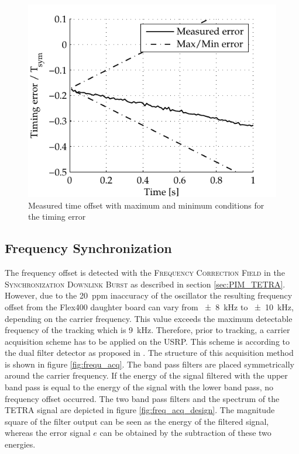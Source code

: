 \begin{figure}[htb]
	\centering
		\includegraphics{../kapitel04/figures/usrp_time_offset.pdf}
	\caption{Measured time offset with maximum and minimum conditions for the timing error}
	\label{fig:usrp_time_offset}
\end{figure}

\subsection{Frequency Synchronization}
The frequency offset is detected with the \textsc{Frequency Correction Field} in the \textsc{Synchronization Downlink Burst} as described in section \ref{sec:PIM_TETRA}. However, due to the \SI{20}{ppm} inaccuracy of the oscillator the resulting frequency offset from the Flex400 daughter board can vary from \SI{\pm 8}{kHz} to \SI{\pm 10}{kHz}, depending on the carrier frequency. This value exceeds the maximum detectable frequency of the tracking which is \SI{9}{kHz}. Therefore, prior to tracking, a carrier acquisition scheme has to be applied on the \ac{USRP}. This scheme is according to the dual filter detector as proposed in \cite{alberty}. The structure of this acquisition method is shown in figure \ref{fig:frequ_acq}. The band pass filters are placed symmetrically around the carrier frequency. If the energy of the signal filtered with the upper band pass is equal to the energy of the signal with the lower band pass, no frequency offset occurred. The two band pass filters and the spectrum of the TETRA signal are depicted in figure \ref{fig:freq_acq_design}. The magnitude square of the filter output can be seen as the energy of the filtered signal, whereas the error signal $e$ can be obtained by the subtraction of these two energies. 

